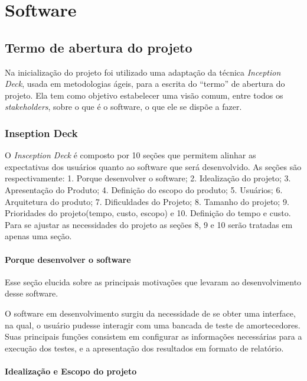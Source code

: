 \chapter[Software]{Software}

\section{Termo de abertura do projeto}

	Na inicialização do projeto foi utilizado uma adaptação da técnica \textit{Inception Deck}, usada em metodologias ágeis, para a escrita do “termo” de abertura do projeto. Ela tem como objetivo estabelecer uma visão comum, entre todos os \textit{stakeholders}, sobre o que é o software, o que ele se dispõe a fazer. 

\subsection{Inseption Deck}

	O \textit{Insception Deck} é composto por 10 seções que permitem alinhar as expectativas dos usuários quanto ao software que será desenvolvido. As seções são respectivamente: 1. Porque desenvolver o software; 2. Idealização do projeto; 3. Apresentação do Produto; 4. Definição do escopo do produto; 5. Usuários; 6. Arquitetura do produto; 7. Dificuldades do Projeto; 8. Tamanho do projeto; 9. Prioridades do projeto(tempo, custo, escopo) e 10. Definição do tempo e custo. Para se ajustar as necessidades do projeto as seções 8, 9 e 10 serão tratadas em apenas uma seção.


\subsubsection{Porque desenvolver o software}

	Esse seção elucida sobre as principais motivações que levaram ao desenvolvimento desse software.

	O software em desenvolvimento surgiu da necessidade de se obter uma  interface, na qual, o usuário pudesse interagir com uma bancada de teste de amortecedores. Suas principais funções consistem em configurar as informações necessárias para a execução dos testes, e a apresentação dos resultados em formato de relatório.


\subsubsection{Idealização e Escopo do projeto}

